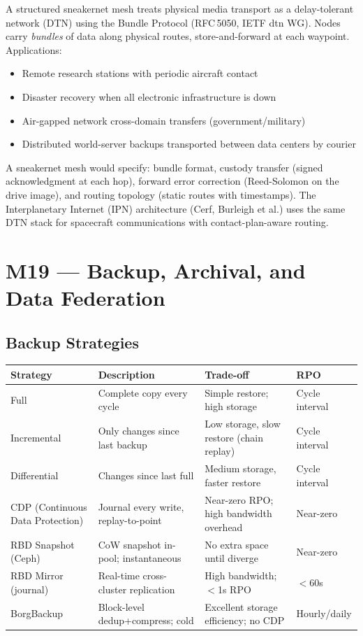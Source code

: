 \documentclass[11pt,letterpaper]{article}
\newcommand{\thead}[1]{\cellcolor{TableHead}\textbf{\sffamily\color{white}\small #1}}
\newcommand{\altrow}{\rowcolor{TableAlt}}
\begin{document}
A structured sneakernet mesh treats physical media transport as a delay-tolerant network (DTN) using the Bundle Protocol (RFC\,5050, IETF dtn WG). Nodes carry \emph{bundles} of data along physical routes, store-and-forward at each waypoint. Applications:
\begin{itemize}[noitemsep]
  \item Remote research stations with periodic aircraft contact
  \item Disaster recovery when all electronic infrastructure is down
  \item Air-gapped network cross-domain transfers (government/military)
  \item Distributed world-server backups transported between data centers by courier
\end{itemize}

A sneakernet mesh would specify: bundle format, custody transfer (signed acknowledgment at each hop), forward error correction (Reed-Solomon on the drive image), and routing topology (static routes with timestamps). The Interplanetary Internet (IPN) architecture (Cerf, Burleigh et al.) uses the same DTN stack for spacecraft communications with contact-plan-aware routing.

\newpage

\section{M19 — Backup, Archival, and Data Federation}

\subsection{Backup Strategies}

\begin{longtable}{p{3cm}p{4cm}p{3.5cm}p{2cm}}
\toprule
\thead{Strategy} & \thead{Description} & \thead{Trade-off} & \thead{RPO} \\
\midrule
\endhead
Full & Complete copy every cycle & Simple restore; high storage & Cycle interval \\
\altrow Incremental & Only changes since last backup & Low storage, slow restore (chain replay) & Cycle interval \\
Differential & Changes since last full & Medium storage, faster restore & Cycle interval \\
\altrow CDP (Continuous Data Protection) & Journal every write, replay-to-point & Near-zero RPO; high bandwidth overhead & Near-zero \\
RBD Snapshot (Ceph) & CoW snapshot in-pool; instantaneous & No extra space until diverge & Near-zero \\
\altrow RBD Mirror (journal) & Real-time cross-cluster replication & High bandwidth; $<$1s RPO & $<$60s \\
BorgBackup & Block-level dedup+compress; cold & Excellent storage efficiency; no CDP & Hourly/daily \\
\bottomrule
\end{longtable}
\end{document}
